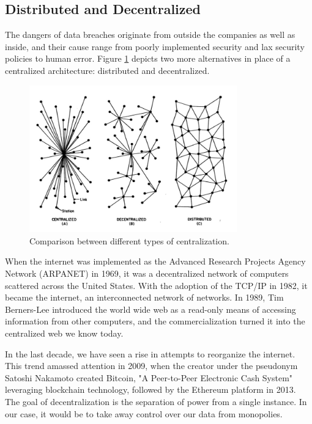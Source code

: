 \subsection{Distributed and Decentralized}
The dangers of data breaches originate from outside the companies as well as inside, and their cause range from poorly implemented security and lax security policies to human error. 
Figure \ref{fig:comparison} depicts two more alternatives in place of a centralized architecture: distributed and decentralized.

\begin{figure}[htpb]
  \centering
  \includegraphics[width=0.8\textwidth]{figures/comparison.jpg}
  \caption{Comparison between different types of centralization.} \label{fig:comparison}
\end{figure}

When the internet was implemented as the Advanced Research Projects Agency Network (ARPANET) in 1969, it was a decentralized network of computers scattered across the United States. With the adoption of the TCP/IP in 1982, it became the internet, an interconnected network of networks.
In 1989, Tim Berners-Lee introduced the world wide web as a read-only means of accessing information from other computers, and the commercialization turned it into the centralized web we know today. 

In the last decade, we have seen a rise in attempts to reorganize the internet. This trend amassed attention in 2009, when the creator under the pseudonym Satoshi Nakamoto created Bitcoin, "A Peer-to-Peer Electronic Cash System" leveraging blockchain technology, followed by the Ethereum platform in 2013.
The goal of decentralization is the separation of power from a single instance. In our case, it would be to take away control over our data from monopolies. 

